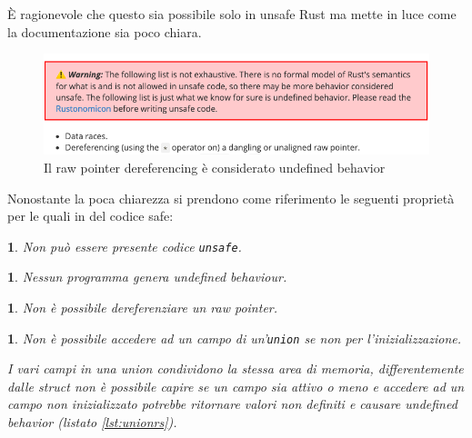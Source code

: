 \documentclass[Lau,binding=0.6cm]{sapthesis}
\newtheorem{lemma}[theorem]{}
\newcommand{\textcode}[1]{\colorbox{backcolour}{\texttt{#1}}}
\begin{document}
È ragionevole che questo sia possibile solo in unsafe Rust ma mette in luce come la documentazione sia poco chiara. 




\begin{figure}[h!t]
    \centering
    \includegraphics[scale=0.52]{images/warning_undefined_behavior.png}
    \caption{Il raw pointer dereferencing è considerato undefined behavior}
    \label{fig:warning}
\end{figure}

Nonostante la poca chiarezza si prendono come riferimento le seguenti proprietà ~\cite[14]{rust:language} per le quali in del codice safe:

\begin{lemma} \label{lemma:unsafe}
	Non può essere presente codice \textnormal{\textcode{unsafe}}.
\end{lemma}

\begin{lemma} \label{lemma:undef_behaviour}
	Nessun programma genera undefined behaviour.
\end{lemma}

\begin{lemma} \label{lemma:raw_pointer}
	Non è possibile dereferenziare un raw pointer.
\end{lemma}

\begin{lemma} \label{lemma:union}
	Non è possibile accedere ad un campo di un'\textnormal{\textcode{union}} se non per l'inizializzazione. 

	\textnormal{I vari campi in una union condividono la stessa area di memoria, differentemente dalle struct non è possibile capire se un campo sia attivo o meno e accedere ad un campo non inizializzato potrebbe ritornare valori non definiti e causare undefined behavior (listato \ref{lst:unionrs}).}
\end{lemma}



\end{document}
